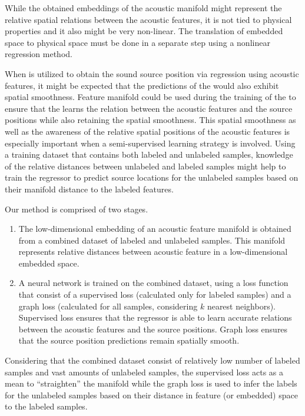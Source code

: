 \documentclass[applsci,article,submit,moreauthors,pdftex]{Definitions/mdpi}
\begin{document}
While the obtained embeddings of the acoustic manifold might represent the relative spatial relations between the acoustic features, it is not tied to physical properties and it also might be very non-linear. The translation of embedded space to physical space must be done in a separate step using a nonlinear regression method. 

When \ann{} is utilized to obtain the sound source position via regression using acoustic features, it might be expected that the predictions of the \ann{} would also exhibit spatial smoothness. Feature manifold could be used during the training of the \ann{} to ensure that the \ann{} learns the relation between the acoustic features and the source positions while also retaining the spatial smoothness.
This spatial smoothness as well as the awareness of the relative spatial positions of the acoustic features is especially important when a semi-supervised learning strategy is involved. Using a training dataset that contains both labeled and unlabeled samples, knowledge of the relative distances between unlabeled and labeled samples might help to train the regressor to predict source locations for the unlabeled samples based on their manifold distance to the labeled features.


Our method is comprised of two stages.
\begin{enumerate}
	\item The low-dimensional embedding of an acoustic feature manifold is obtained from a combined dataset of labeled and unlabeled samples. This manifold represents relative distances between acoustic feature in a low-dimensional embedded space.
	\item A neural network is trained on the combined dataset, using a loss function that consist  of a supervised loss (calculated only for labeled samples) and a graph loss (calculated for all samples, considering $ k $ nearest neighbors). Supervised loss ensures that the regressor is able to learn accurate relations between the acoustic features and the source positions. Graph loss ensures that the source position predictions remain spatially smooth.
\end{enumerate}

Considering that the combined dataset consist of relatively low number of labeled samples and vast amounts of unlabeled samples, the supervised loss acts as a mean to ``straighten'' the manifold while the graph loss is used to infer the labels for the unlabeled samples based on their distance in feature (or embedded) space to the labeled samples.
\end{document}
